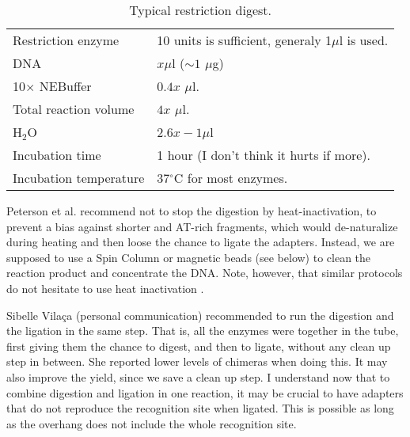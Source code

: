 \documentclass[a4paper,12pt]{article}
\begin{document}
\begin{table}
\begin{center}
\caption{Typical restriction digest.}\label{tau:digest}
\vspace{0.3cm}
\begin{tabular}{ll}
\toprule
Restriction enzyme&10 units is sufficient, generaly 1$\mu$l is used.\\
DNA&$x \mu$l ($\sim1$ $\mu$g)\\
10$\times$ NEBuffer& $0.4x$ $\mu$l.\\
Total reaction volume&$4x$ $\mu$l.\\
H$_2$O&$2.6x - 1 \mu$l\\
Incubation time&1 hour (I don't think it hurts if more).\\
Incubation temperature&37$^{\circ}$C for most enzymes.\\
\bottomrule
\end{tabular}
\end{center}
\end{table}

Peterson et al. \cite{Peterson2012} recommend not to stop the digestion by heat-inactivation, to prevent a bias against shorter and AT-rich fragments, which would de-naturalize during heating and then loose the chance to ligate the adapters. Instead, we are supposed to use a Spin Column or magnetic beads (see below) to clean the reaction product and concentrate the DNA. Note, however, that similar protocols do not hesitate to use heat inactivation \cite{Andolfatto2011,Etter2011}.

Sibelle Vilaça (personal communication) recommended to run the digestion and the ligation in the same step. That is, all the enzymes were together in the tube, first giving them the chance to digest, and then to ligate, without any clean up step in between. She reported lower levels of chimeras when doing this. It may also improve the yield, since we save a clean up step. I understand now that to combine digestion and ligation in one reaction, it may be crucial to have adapters that do not reproduce the recognition site when ligated. This is possible as long as the overhang does not include the whole recognition site.
\end{document}
